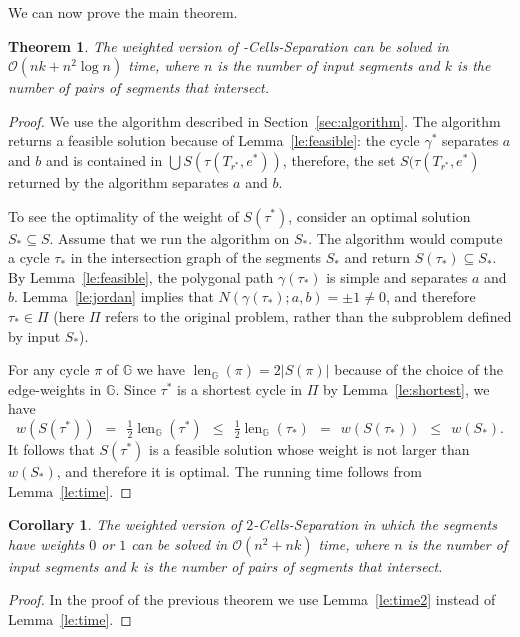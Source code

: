 \documentclass[11pt,a4paper]{article}
\newtheorem{theorem}[definition]{Theorem}
\newtheorem{corollary}[definition]{Corollary}
\def\I{\ensuremath{\mathbb{G}}}
\def\cycle{\ensuremath{\tau}}
\DeclareMathOperator{\lengthBIS}{len}
\newcommand\length{\lengthBIS_{\I}}
\begin{document}
We can now prove the main theorem.
\begin{theorem}\label{thm:separation}
	The weighted version of {-Cells-Separation} can be solved in $\mathcal{O}(nk+n^2\log n)$ time,
	where $n$ is the number of input segments and $k$ is the number of pairs of segments that intersect.
\end{theorem}
\begin{proof}
	We use the algorithm described in Section~\ref{sec:algorithm}.
	The algorithm returns a feasible solution because of Lemma~\ref{le:feasible}:
	the cycle $\gamma^*$ separates $a$ and $b$ and
	is contained in $\bigcup S(\cycle(T_{r^*},e^*))$, therefore, 
	the set $S(\cycle(T_{r^*},e^*)$ returned by the algorithm separates $a$ and $b$.
	
	To see the optimality of the weight of $S(\tau^*)$, consider an optimal solution $S_*\subseteq S$.
	Assume that we run the algorithm on $S_*$.
	The algorithm would compute a cycle $\tau_*$ in the intersection graph of the segments $S_*$
	and return $S(\tau_*)\subseteq S_*$. By Lemma~\ref{le:feasible},
	the polygonal path $\gamma(\tau_*)$ is simple and separates $a$ and $b$.
	Lemma~\ref{le:jordan} implies that $N(\gamma(\tau_*);a,b)=\pm 1 \not =0$,
	and therefore $\tau_*\in \Pi$ (here $\Pi$ refers to the original problem, rather than the subproblem
	defined by input $S_*$).
	
	For any cycle $\pi$ of $\I$ we have $\length(\pi)= 2 |S(\pi)|$ because of the choice of the edge-weights in $\I$. 
	Since $\tau^*$ is a shortest cycle in $\Pi$ by Lemma~\ref{le:shortest},
	we have
	\[ 
		w(S(\tau^*))~~=~~\tfrac 12 \length (\tau^*) 
					~~\le~~ \tfrac 12 \length(\tau_*) 
					~~=~~ w(S(\tau_*))
					~~\le~~ w(S_*).
	\]
	It follows that $S(\tau^*)$ is a feasible solution whose weight is not larger than $w(S_*)$,
	and therefore it is optimal.
	The running time follows from Lemma~\ref{le:time}.
\end{proof}


\begin{corollary}\label{co:separation}
	The weighted version of {\sc $2$-Cells-Separation} in which the segments have weights $0$ or $1$ 
	can be solved in $\mathcal{O}(n^2+nk)$ time,
	where $n$ is the number of input segments and $k$ is the number of pairs of segments that intersect.
\end{corollary}
\begin{proof}
	In the proof of the previous theorem we use Lemma~\ref{le:time2} instead of Lemma~\ref{le:time}.
\end{proof}
\end{document}
